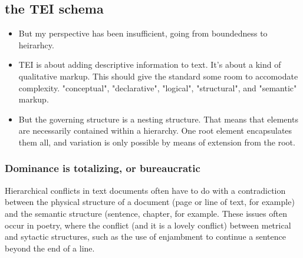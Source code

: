 \documentclass[11pt]{article}
\begin{document}
\subsection{the TEI schema}
\label{sec:org959584f}
\begin{itemize}
\item But my perspective has been insufficient, going from boundedness to
heirarhcy.
\item TEI is about adding descriptive information to text. It's about a
kind of qualitative markup. This should give the standard some room
to accomodate complexity. "conceptual", "declarative", "logical",
"structural", and "semantic" markup.
\item But the governing structure is a nesting structure. That means that
elements are necessarily contained within a hierarchy. One root
element encapsulates them all, and variation is only possible by
means of extension from the root.
\end{itemize}

\subsubsection{Dominance is totalizing, or bureaucratic}
\label{sec:org6355656}
Hierarchical conflicts in text documents often have to do with a
contradiction between the physical structure of a document (page or
line of text, for example) and the semantic structure (sentence,
chapter, for example. These issues often occur in poetry, where the
conflict (and it is a lovely conflict) between metrical and sytactic
structures, such as the use of enjambment to continue a sentence
beyond the end of a line. 
\end{document}
